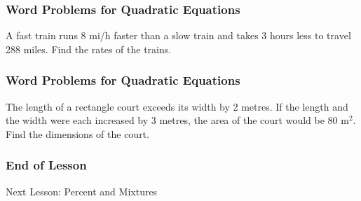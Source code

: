 \documentclass[xcolor=dvipsnames]{beamer}
\begin{document}
\begin{frame}
  \frametitle{Word Problems for Quadratic Equations}
{\ubung} A fast train runs 8 mi/h faster than a slow train and takes 3 hours
less to travel 288 miles. Find the rates of the trains.
\end{frame}

\begin{frame}
  \frametitle{Word Problems for Quadratic Equations}
{\ubung} The length of a rectangle court exceeds its width by 2 metres. If the
length and the width were each increased by 3 metres, the area of the
court would be 80 m$^{2}$. Find the dimensions of the court.
\end{frame}

\begin{frame}
  \frametitle{End of Lesson}
Next Lesson: Percent and Mixtures
\end{frame}
\end{document}
